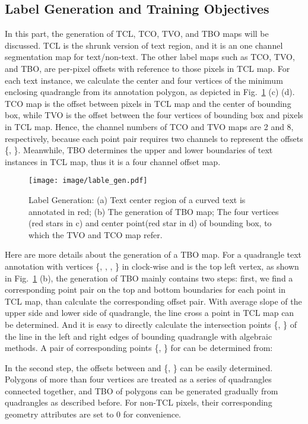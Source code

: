 \documentclass[sigconf]{acmart}
\begin{document}
\subsection{Label Generation and Training Objectives}
In this part, the generation of TCL, TCO, TVO, and TBO maps will be discussed. TCL is the shrunk version of text region, and it is an one channel segmentation map for text/non-text. 
The other label maps such as TCO, TVO, and TBO, are per-pixel offsets with reference to those pixels in TCL map. 
For each text instance, we calculate the center and four vertices of the minimum enclosing quadrangle from its annotation polygon, as depicted in Fig.~\ref{fig:label_gen} (c) (d). TCO map is the offset between pixels in TCL map and the center of bounding box, while TVO is the offset between the four vertices of bounding box and pixels in TCL map. 
Hence, the channel numbers of TCO and TVO maps are 2 and 8, respectively, because each point pair requires two channels to represent the offsets \{, \}.
Meanwhile, TBO determines the upper and lower boundaries of text instances in TCL map, thus it is a four channel offset map.


\begin{figure}
  \texttt{[image: image/lable\_gen.pdf]}
  \caption{Label Generation: (a) Text center region of a curved text is annotated in red; (b) The generation of TBO map; The four vertices (red stars in c) and center point(red star in d) of bounding box, to which the TVO and TCO map refer.  }
  \label{fig:label_gen}
\end{figure}


Here are more details about the generation of a TBO map. For a quadrangle text annotation with vertices \{, , ,  \} in clock-wise and  is the top left vertex, as shown in Fig.~\ref{fig:label_gen} (b), the generation of TBO mainly contains two steps: first, we find a corresponding point pair on the top and bottom boundaries for each point in TCL map, than calculate the corresponding offset pair. With average slope of the upper side and lower side of quadrangle, the line cross a point   in TCL map can be determined. And it is easy to directly calculate the intersection points \{,  \} of the line in the left and right edges of bounding quadrangle with algebraic methods. A pair of corresponding points \{,  \} for  can be determined from: 
 
In the second step, the offsets between  and \{,  \} can be easily determined. Polygons of more than four vertices are treated as a series of quadrangles connected together, and TBO of polygons can be generated gradually from quadrangles as described before. For non-TCL pixels, their corresponding geometry attributes are set to 0 for convenience.
\end{document}
